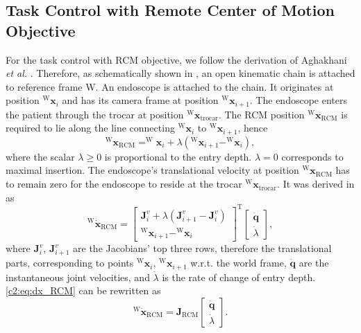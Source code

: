\subsection{Task Control with Remote Center of Motion Objective}
\label{c2:sec:task_rcm}
For the task control with RCM objective, we follow the derivation of Aghakhani \emph{et al.}  \cite{aghakhani2013task}. Therefore, as schematically shown in , an open kinematic chain is attached to reference frame W. An endoscope is attached to the chain. It originates at position $^\text{W}\mathbf{x}_i$ and has its camera frame at position $^\text{W}\mathbf{x}_{i+1}$. The endoscope enters the patient through the trocar at position $^\text{W}\mathbf{x}_\text{trocar}$. The RCM position $^\text{W}\mathbf{x}_\text{RCM}$ is required to lie along the line connecting $^\text{W}\mathbf{x}_i$ to $^\text{W}\mathbf{x}_{i+1}$, hence
\begin{equation}
^\text{W}\mathbf{x}_\text{RCM} = ^\text{W}\mathbf{x}_i+\lambda\left(^\text{W}\mathbf{x}_{i+1} - ^\text{W}\mathbf{x}_i\right),
\label{c2:eq:lambda}
\end{equation}
where the scalar $\lambda \geq 0$ is proportional to the entry depth. $\lambda = 0$ corresponds to maximal insertion. The endoscope's translational velocity at position $^\text{W}\mathbf{x}_\text{RCM}$ has to remain zero for the endoscope to reside at the trocar $^\text{W}\mathbf{x}_\text{trocar}$. It was derived in \cite{aghakhani2013task} as
\begin{equation}
    ^\text{W}\dot{\mathbf{x}}_\text{RCM} = \begin{bmatrix}\mathbf{J}^v_i + \lambda(\mathbf{J}^v_{i+1}-\mathbf{J}^v_i)\\ ^\text{W}\mathbf{x}_{i+1} - ^\text{W}\mathbf{x}_i\end{bmatrix}^\text{T}\begin{bmatrix}\dot{\mathbf{q}} \\ \dot{\lambda}\end{bmatrix},
    \label{c2:eq:dx_RCM}
\end{equation}
where $\mathbf{J}^v_i$, $\mathbf{J}^v_{i+1}$ are the Jacobians' top three rows, therefore the translational parts, corresponding to points $^\text{W}\mathbf{x}_i$, $^\text{W}\mathbf{x}_{i+1}$ w.r.t. the world frame, $\dot{\mathbf{q}}$ are the instantaneous joint velocities, and $\dot{\lambda}$ is the rate of change of entry depth. \eqref{c2:eq:dx_RCM} can be rewritten as
\begin{equation}
    ^\text{W}\dot{\mathbf{x}}_\text{RCM} = \mathbf{J}_\text{RCM}\begin{bmatrix}\dot{\mathbf{q}} \\ \dot{\lambda}\end{bmatrix}.
    \label{c2:eq:dx_RCM_short}
\end{equation}
